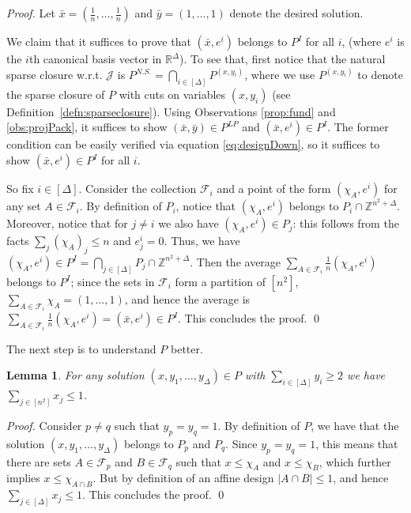 \documentclass[smallextended]{svjour3}
\newtheorem{lemma}[proposition]{Lemma}
\begin{document}
	\begin{proof}
		Let $\bar{x} = (\frac{1}{n}, \ldots, \frac{1}{n})$ and $\bar{y} = (1, \ldots, 1)$ denote the desired solution.
		
		We claim that it suffices to prove that $(\bar{x}, e^i)$ belongs to $P^I$ for all $i$, (where $e^i$ is the $i$th canonical basis vector in ${\mathbb{R}}^{\Delta}$). To see that, first notice that the natural sparse closure w.r.t. ${\mathcal{J}}$ is 	$P^{N.S.} = \bigcap_{i \in [\Delta]} P^{(x,y_i)}$, where we use $P^{(x,y_i)}$ to denote the sparse closure of $P$ with cuts on variables $(x,y_i)$ (see Definition~\ref{defn:sparseclosure}). 
Using Observations \ref{prop:fund} and \ref{obs:projPack}, it suffices to show $(\bar{x}, \bar{y}) \in P^{LP}$ and $(\bar{x}, e^i) \in P^I$. The former condition can be easily verified via equation \eqref{eq:designDown}, so it suffices to show $(\bar{x}, e^i) \in P^I$ for all $i$.
		
		So fix $i \in [\Delta]$. Consider the collection ${\mathcal{F}}_i$ and a point of the form $(\chi_A, e^i)$ for any set $A \in {\mathcal{F}}_i$. By definition of $P_i$, notice that $(\chi_A, e^i)$ belongs to $P_i \cap {\mathbb{Z}}^{n^2 + \Delta}$. Moreover, notice that for $j \neq i$ we also have $(\chi_A, e^i) \in P_j$: this follows from the facts $\sum_j (\chi_A)_j \le n$ and $e^i_j = 0$. Thus, we have $(\chi_A, e^i) \in P^I = \bigcap_{j \in [\Delta]} P_j \cap {\mathbb{Z}}^{n^2 + \Delta}$. Then the average $\sum_{A \in {\mathcal{F}}_i} \frac{1}{n} (\chi_A, e^i)$ belongs to $P^I$; since the sets in ${\mathcal{F}}_i$ form a partition of $[n^2]$, $\sum_{A \in {\mathcal{F}}_i} \chi_A = (1,\ldots, 1)$, and hence the average is $\sum_{A \in {\mathcal{F}}_i} \frac{1}{n} (\chi_A, e^i) = (\bar{x}, e^i) \in P^I$. This concludes the proof. {
\ifmp
	\hfill \qed
\fi
}
	\end{proof}

	The next step is to understand $P$ better. 
	
	\begin{lemma}\label{lemma:designIP}
		For any solution $(x, y_1, \ldots, y_\Delta) \in P$ with $\sum_{i \in [\Delta]} y_i \ge 2$ we have $\sum_{j \in [n^2]} x_j \le 1$.
	\end{lemma}
	
	\begin{proof}
		Consider $p\neq q$ such that $y_p = y_q = 1$. By definition of $P$, we have that the solution $(x, y_1, \ldots, y_\Delta)$ belongs to $P_p$ and $P_q$. Since $y_p = y_q = 1$, this means that there are sets $A \in {\mathcal{F}}_p$ and $B \in {\mathcal{F}}_q$ such that $x \le \chi_A$ and $x \le \chi_B$, which further implies $x \le \chi_{A \cap B}$. But by definition of an affine design $|A \cap B| \le 1$, and hence $\sum_{j \in [\Delta]} x_j \le 1$. This concludes the proof. {
\ifmp
	\hfill \qed
\fi
}
	\end{proof}
\end{document}
